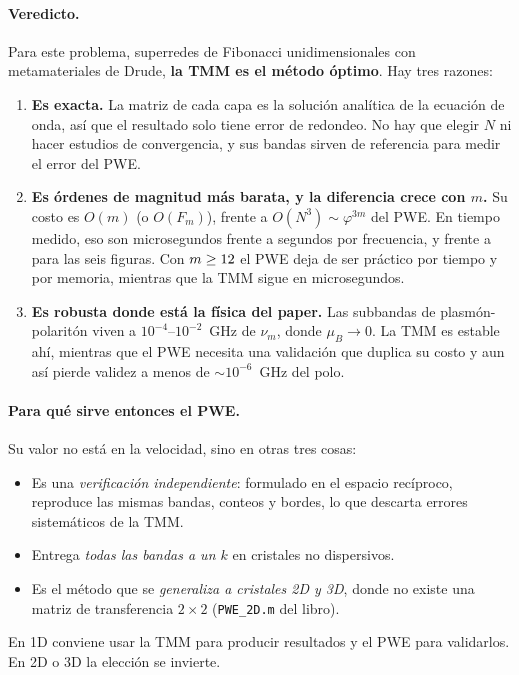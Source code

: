 \documentclass[11pt,a4paper]{article}
\newcommand{\code}[1]{\texttt{#1}}
\begin{document}
\paragraph{Veredicto.} Para este problema, superredes de Fibonacci
unidimensionales con metamateriales de Drude, \textbf{la TMM es el método óptimo}.
Hay tres razones:
\begin{enumerate}
\item \textbf{Es exacta.} La matriz de cada capa es la solución analítica de la
ecuación de onda, así que el resultado solo tiene error de redondeo. No hay que
elegir $N$ ni hacer estudios de convergencia, y sus bandas sirven de referencia
para medir el error del PWE.
\item \textbf{Es órdenes de magnitud más barata, y la diferencia crece con $m$.}
Su costo es $O(m)$ (o $O(F_m)$), frente a $O(N^3)\sim\varphi^{3m}$ del PWE. En
tiempo medido, eso son microsegundos frente a segundos por frecuencia, y
\EffFigTmmTotal{} frente a \EffFigPweTotal{} para las seis figuras. Con
$m\ge12$ el PWE deja de ser
práctico por tiempo y por memoria, mientras que la TMM sigue en
microsegundos.
\item \textbf{Es robusta donde está la física del paper.} Las subbandas de
plasmón-polaritón viven a $10^{-4}$--$10^{-2}$~GHz de $\nu_m$, donde $\mu_B\to0$.
La TMM es estable ahí, mientras que el PWE necesita una validación que duplica su
costo y aun así pierde validez a menos de $\sim10^{-6}$~GHz del polo.
\end{enumerate}

\paragraph{Para qué sirve entonces el PWE.} Su valor no está en la velocidad, sino
en otras tres cosas:
\begin{itemize}
\item Es una \emph{verificación independiente}: formulado en el espacio
recíproco, reproduce las mismas bandas, conteos y bordes, lo que descarta errores
sistemáticos de la TMM.
\item Entrega \emph{todas las bandas a un $k$} en cristales no dispersivos.
\item Es el método que se \emph{generaliza a cristales 2D y 3D}, donde no existe
una matriz de transferencia $2\times2$ (\code{PWE\_2D.m} del libro).
\end{itemize}
En 1D conviene usar la TMM para producir resultados y el PWE para validarlos. En
2D o 3D la elección se invierte.
\end{document}
